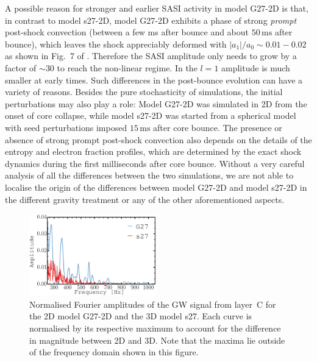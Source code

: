 A possible reason for stronger and earlier SASI activity in model G27-2D
is that, in contrast to
model s27-2D, model G27-2D exhibits a phase of strong \emph{prompt}
post-shock convection (between a few ms after bounce and about $50 \, \mathrm{ms}$
after bounce), which leaves the shock appreciably deformed with
$|a_1|/a_0 \sim 0.01-0.02$ as shown in Fig.~7 of
\citet{mueller_12b}. Therefore the SASI amplitude only needs to grow by
a factor of $\mathord{\sim} 30$ to reach the non-linear regime. In
\citet[][Fig.~2]{hanke_13} the $l = 1$ amplitude is much smaller at early
times.  Such differences in the post-bounce evolution can have a
variety of reasons. Besides the pure stochasticity of simulations, the
initial perturbations may also play a role: Model G27-2D was simulated in
2D from the onset of core collapse, while model s27-2D was started
from a spherical model with seed perturbations imposed $15 \, \mathrm{ms}$ after
core bounce. The presence or absence of strong prompt post-shock
convection also depends on the details of the entropy and electron
fraction profiles, which are determined by the exact shock dynamics
during the first milliseconds after core bounce. Without a very
careful analysis of all the differences between the two simulations,
we are not able to localise the origin of the differences
between model G27-2D and model s27-2D in the different gravity treatment
or any of the other aforementioned aspects.
\begin{figure}
\includegraphics[width=0.49\textwidth]{./images/chp1/fig10.pdf}
\caption{Normalised Fourier amplitudes of the GW signal from layer~C
for the 2D model G27-2D and the 3D model s27. Each curve is normalised by its respective maximum to account for
the difference in magnitude between 2D and 3D. Note that the maxima lie outside of the frequency domain shown in this figure.
\label{fig:post3v2}}
\end{figure}

